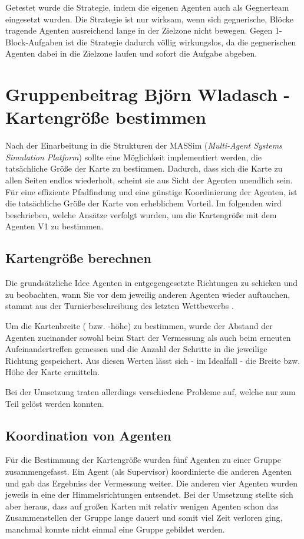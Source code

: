 \documentclass[runningheads]{llncs}
\begin{document}
	Getestet wurde die Strategie, indem die eigenen Agenten auch als Gegnerteam eingesetzt wurden. Die Strategie ist nur wirksam, wenn sich gegnerische, Blöcke tragende Agenten ausreichend lange in der Zielzone nicht bewegen. Gegen 1-Block-Aufgaben ist die Strategie dadurch völlig wirkungslos, da die gegnerischen Agenten dabei in die Zielzone laufen und sofort die Aufgabe abgeben.
	
	\section{Gruppenbeitrag Björn Wladasch - Kartengröße bestimmen}
	Nach der Einarbeitung in die Strukturen der MASSim (\textit{Multi-Agent Systems Simulation Platform}) \cite{EISMASSim} sollte eine Möglichkeit implementiert werden, die tatsächliche Größe der Karte zu bestimmen.
	Dadurch, dass sich die Karte zu allen Seiten endlos wiederholt, scheint sie aus Sicht der Agenten unendlich sein. Für eine effiziente Pfadfindung und eine günstige Koordinierung der Agenten, ist  die tatsächliche Größe der Karte von erheblichem Vorteil. Im folgenden wird beschrieben, welche Ansätze verfolgt wurden, um die Kartengröße mit dem Agenten V1 zu bestimmen.
	
	\subsection{Kartengröße berechnen}
	Die grundsätzliche Idee Agenten in entgegengesetzte Richtungen zu schicken und zu beobachten, wann Sie vor dem jeweilig anderen Agenten wieder auftauchen, stammt aus der Turnierbeschreibung des letzten Wettbewerbs \cite[S.136]{MAPC2021}.
	
	Um die Kartenbreite ( bzw. -höhe) zu bestimmen, wurde der Abstand der Agenten zueinander sowohl beim Start der Vermessung als auch beim erneuten Aufeinandertreffen gemessen und die Anzahl der Schritte in die jeweilige Richtung gespeichert. Aus diesen Werten lässt sich - im Idealfall - die Breite bzw. Höhe der Karte ermitteln.
	
	Bei der Umsetzung traten allerdings verschiedene Probleme auf, welche nur zum Teil gelöst werden konnten.
	
	\subsection{Koordination von Agenten}
	Für die Bestimmung der Kartengröße wurden fünf Agenten zu einer Gruppe zusammengefasst. Ein Agent (als Supervisor) koordinierte die anderen Agenten und gab das Ergebniss der Vermessung weiter. Die anderen vier Agenten wurden jeweils in eine der Himmelsrichtungen entsendet.
	Bei der Umsetzung stellte sich aber heraus, dass auf großen Karten mit relativ wenigen Agenten schon das Zusammenstellen der Gruppe lange dauert und somit viel Zeit verloren ging, manchmal konnte nicht einmal eine Gruppe gebildet werden.
	
\end{document}
